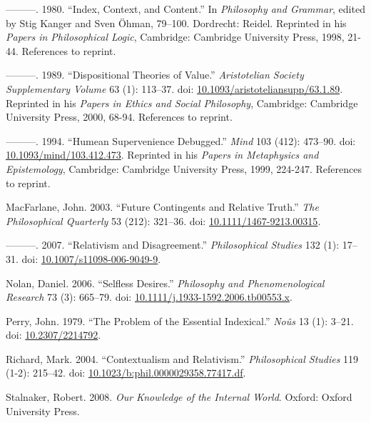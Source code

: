 \documentclass[
  11pt,
  letterpaper,
  DIV=11,
  numbers=noendperiod,
  twoside]{scrartcl}
\newlength{\cslhangindent}
\newenvironment{CSLReferences}[2] %
 {\begin{list}{}{%
  \setlength{\itemindent}{0pt}
  \setlength{\leftmargin}{0pt}
  \setlength{\parsep}{0pt}
  \ifodd #1
   \setlength{\leftmargin}{\cslhangindent}
   \setlength{\itemindent}{-1\cslhangindent}
  \fi
  \setlength{\itemsep}{#2\baselineskip}}}
 {\end{list}}
\begin{document}
\begin{CSLReferences}{1}{0}
---------. 1980. {``Index, Context, and Content.''} In \emph{Philosophy
and Grammar}, edited by Stig Kanger and Sven Öhman, 79--100. Dordrecht:
Reidel. Reprinted in his \emph{Papers in Philosophical Logic},
Cambridge: Cambridge University Press, 1998, 21-44. References to
reprint.

---------. 1989. {``Dispositional Theories of Value.''}
\emph{Aristotelian Society Supplementary Volume} 63 (1): 113--37. doi:
\href{https://doi.org/10.1093/aristoteliansupp/63.1.89}{10.1093/aristoteliansupp/63.1.89}.
Reprinted in his \emph{Papers in Ethics and Social Philosophy},
Cambridge: Cambridge University Press, 2000, 68-94. References to
reprint.

---------. 1994. {``Humean Supervenience Debugged.''} \emph{Mind} 103
(412): 473--90. doi:
\href{https://doi.org/10.1093/mind/103.412.473}{10.1093/mind/103.412.473}.
Reprinted in his \emph{Papers in Metaphysics and Epistemology},
Cambridge: Cambridge University Press, 1999, 224-247. References to
reprint.

MacFarlane, John. 2003. {``Future Contingents and Relative Truth.''}
\emph{The Philosophical Quarterly} 53 (212): 321--36. doi:
\href{https://doi.org/10.1111/1467-9213.00315}{10.1111/1467-9213.00315}.

---------. 2007. {``{Relativism and Disagreement}.''}
\emph{Philosophical Studies} 132 (1): 17--31. doi:
\href{https://doi.org/10.1007/s11098-006-9049-9}{10.1007/s11098-006-9049-9}.

Nolan, Daniel. 2006. {``Selfless Desires.''} \emph{Philosophy and
Phenomenological Research} 73 (3): 665--79. doi:
\href{https://doi.org/10.1111/j.1933-1592.2006.tb00553.x}{10.1111/j.1933-1592.2006.tb00553.x}.

Perry, John. 1979. {``The Problem of the Essential Indexical.''}
\emph{No{û}s} 13 (1): 3--21. doi:
\href{https://doi.org/10.2307/2214792}{10.2307/2214792}.

Richard, Mark. 2004. {``Contextualism and Relativism.''}
\emph{Philosophical Studies} 119 (1-2): 215--42. doi:
\href{https://doi.org/10.1023/b:phil.0000029358.77417.df}{10.1023/b:phil.0000029358.77417.df}.

Stalnaker, Robert. 2008. \emph{Our Knowledge of the Internal World}.
Oxford: Oxford University Press.


\end{CSLReferences}
\end{document}
